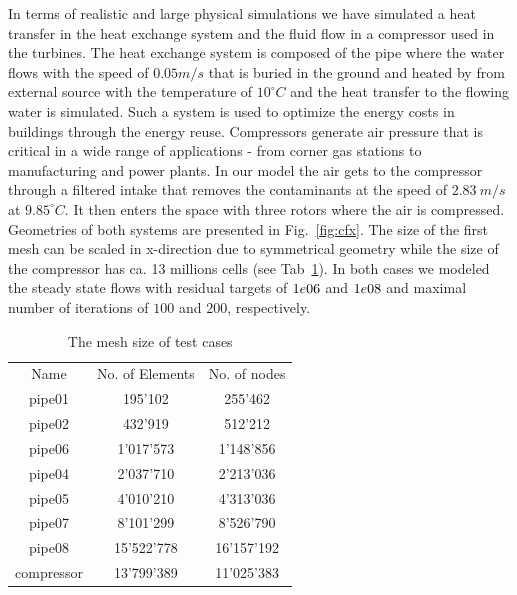 \documentclass[3p,times]{elsarticle}
\begin{document}
In terms of realistic and large physical simulations we have simulated a heat transfer in the heat exchange system and the fluid flow in a compressor used in the turbines. The heat exchange system is composed of the  pipe where the water flows with the speed of $0.05 m/s$ that is buried in the ground and heated by from external source with the temperature of $10 ^\circ C$ and the heat transfer to the flowing water is simulated. Such a system is used to optimize the energy costs in buildings through the energy reuse.  
Compressors generate air pressure that is critical in a wide range of applications - from corner gas stations to manufacturing and power plants. In our model the air gets to the compressor through a filtered intake that removes the contaminants at the speed of $2.83\ m/s$ at $9.85 ^\circ C$. It then enters the space with three rotors where the air is compressed. Geometries of both systems are presented in Fig.~\ref{fig:cfx}. The size of the first mesh can be scaled  in x-direction due to symmetrical geometry while the size of the compressor has ca. 13 millions cells (see Tab~\ref{tab:MeshSize}). In both cases we modeled the steady state flows with residual targets of $1e\-06$ and $1e\-08$ and maximal number of iterations of $100$ and $200$, respectively. 

\begin{table}
	\centering
		\begin{tabular} {|c|c|c|}
			\hline
			Name & No. of Elements & No. of nodes \\			
			pipe01 & 195'102 & 255'462 \\ \hline
			pipe02 & 432'919 & 512'212 \\ \hline
			pipe06 & 1'017'573 & 1'148'856 \\ \hline
			pipe04 & 2'037'710 & 2'213'036 \\ \hline
			pipe05 & 4'010'210 & 4'313'036 \\ \hline			
			pipe07 & 8'101'299 & 8'526'790 \\ \hline
			pipe08 & 15'522'778 & 16'157'192 \\ \hline
			compressor & 13'799'389  & 11'025'383 \\ \hline
		\end{tabular}
	\caption{The mesh size of test cases}
	\label{tab:MeshSize}
\end{table}
\end{document}
